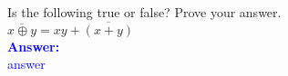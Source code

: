\item{}
Is the following true or false? Prove your answer.\\[6pt]
$\overline{x\oplus y}=xy+\overline{(x+y)}$\\[12pt]
\ifanswers
\textcolor{blue}{
\textbf{Answer:}\\
answer
}
\newpage
\fi

